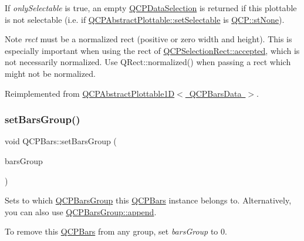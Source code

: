 If {\itshape only\+Selectable} is true, an empty \mbox{\hyperlink{class_q_c_p_data_selection}{Q\+C\+P\+Data\+Selection}} is returned if this plottable is not selectable (i.\+e. if \mbox{\hyperlink{class_q_c_p_abstract_plottable_ac238d6e910f976f1f30d41c2bca44ac3}{Q\+C\+P\+Abstract\+Plottable\+::set\+Selectable}} is \mbox{\hyperlink{namespace_q_c_p_ac6cb9db26a564b27feda362a438db038aa64628e338a2dd1e6f0dc84dec0b63fe}{Q\+C\+P\+::st\+None}}).

\begin{DoxyNote}{Note}
{\itshape rect} must be a normalized rect (positive or zero width and height). This is especially important when using the rect of \mbox{\hyperlink{class_q_c_p_selection_rect_a15a43542e1f7b953a44c260b419e6d2c}{Q\+C\+P\+Selection\+Rect\+::accepted}}, which is not necessarily normalized. Use {\ttfamily Q\+Rect\+::normalized()} when passing a rect which might not be normalized. 
\end{DoxyNote}


Reimplemented from \mbox{\hyperlink{class_q_c_p_abstract_plottable1_d_ac385c38a79e419ed3600c2ee398fd216}{Q\+C\+P\+Abstract\+Plottable1\+D$<$ Q\+C\+P\+Bars\+Data $>$}}.

\mbox{\label{class_q_c_p_bars_aedd1709061f0b307c47ddb45e172ef9a}} 
\subsubsection{\texorpdfstring{set\+Bars\+Group()}{setBarsGroup()}}
{\footnotesize\ttfamily void Q\+C\+P\+Bars\+::set\+Bars\+Group (\begin{DoxyParamCaption}\item[{\mbox{\hyperlink{class_q_c_p_bars_group}{Q\+C\+P\+Bars\+Group}} $\ast$}]{bars\+Group }\end{DoxyParamCaption})}

Sets to which \mbox{\hyperlink{class_q_c_p_bars_group}{Q\+C\+P\+Bars\+Group}} this \mbox{\hyperlink{class_q_c_p_bars}{Q\+C\+P\+Bars}} instance belongs to. Alternatively, you can also use \mbox{\hyperlink{class_q_c_p_bars_group_a809ed63cc4ff7cd5b0b8c96b470163d3}{Q\+C\+P\+Bars\+Group\+::append}}.

To remove this \mbox{\hyperlink{class_q_c_p_bars}{Q\+C\+P\+Bars}} from any group, set {\itshape bars\+Group} to 0. \mbox{\label{class_q_c_p_bars_a574ec7eb7537566df1a28ff085d75623}} 
